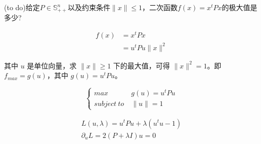 \begin{problem}
	(to do)给定$P\in\mathbb{S}_{++}^n$以及约束条件$\|x\|\le 1$，二次函数$f(x)=x^tPx$的极大值是多少?
\end{problem}
\begin{solution}
	$$\begin{aligned}
		f(x) &= x^tPx \\
		&=u^tPu \|x\|^2
	\end{aligned}$$

	其中 $u$ 是单位向量，求 $\|x\| \ge 1$ 下的最大值，可得 $\|x\|^2=1$。即 $f_{max} = g(u)$，其中 $g(u) = u^tPu$。

	$$\begin{cases}
		max\ &g(u) = u^tPu\\
		subject\ to\ &\|u\| = 1
	\end{cases}$$

	$$\begin{array}{c}
		L(u, \lambda) = u^tPu + \lambda(u^tu - 1)\\
		\partial_uL = 2(P + \lambda I)u = 0
	\end{array}$$
\end{solution}


